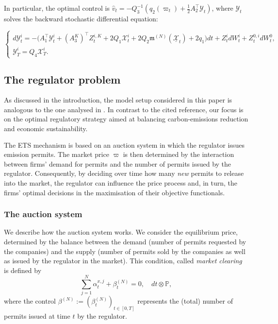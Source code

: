 \documentclass[10pt,a4paper]{amsart}
\numberwithin{equation}{section}
\newcommand{\w}{\varpi}
\begin{document}
In particular, the optimal control is $\widehat{v}_t=-Q_3^{-1}(q_2(\w_t)+\frac{1}{2}A_2^\top \mathcal{Y}_t)$, where $\mathcal{Y}_t$ solves the backward stochastic differential equation:


\begin{equation} 
\label{eqn: adjoint process N}
\begin{cases}
d\mathcal{Y}^i_t = -\big( A_1^\top \mathcal{Y}^i_t + (A^K_3)^\top Z^{i,K}_t + 2Q_1\mathcal{X}^i_t + 2Q_2 \mathfrak{m}^{(N)}(\underline{\mathcal{X}}_t) + 2q_1 \big)dt + Z^i_t dW^i_t + Z^{0,i}_t dW^0_t ,\\
\mathcal{Y}^i_T = Q_4\mathcal{X}^i_T.
\end{cases}
\end{equation} 

\subsection{The regulator problem}
\label{subsect_model_N:regulator}
As discussed in the introduction, the model setup considered in this paper is analogous to the one analysed in \cite[Section 3]{del2024mean}. In contrast to the cited reference, our focus is on the optimal regulatory strategy aimed at balancing carbon-emissions reduction and economic sustainability. 

The ETS mechanism is based on an auction system in which the regulator issues emission permits. The market price $\varpi$ is then determined by the interaction between firms’ demand for permits and the number of permits issued by the regulator. Consequently, by deciding over time how many \emph{new} permits to release into the market, the regulator can influence the price process and, in turn, the firms’ optimal decisions in the maximisation of their objective functionals.

\subsubsection{The auction system}
We describe how the auction system works. We consider the equilibrium price, determined by the balance between the demand (number of permits requested by the companies) and the supply (number of permits sold by the companies as well as issued by the regulator in the market). This condition, called \emph{market clearing} is defined by
\begin{equation}
\label{eqn: market clearing N market}
\sum_{j = 1}^{N} \alpha^{x,j}_t + \beta^{(N)}_t = 0,\quad dt\otimes \mathbb{P},
\end{equation} 
where the control $\beta^{(N)}:= (\beta^{(N)}_t)_{t\in[0,T]}$  represents the (total) number of permits issued at time $t$ by the regulator.
\end{document}
